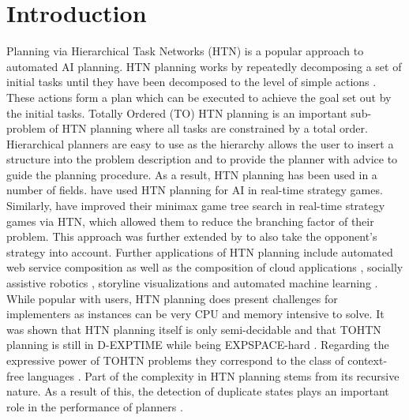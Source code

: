 \documentclass[enabledeprecatedfontcommands,12pt,a4paper,twoside]{scrartcl}
\numberwithin{equation}{section}
\begin{document}
\clearpage


\listoffigures
\listoftables
\listofalgorithms

\clearpage


\section{Introduction}
Planning via Hierarchical Task Networks (HTN) is a popular approach to automated AI planning. HTN planning works by repeatedly decomposing a set of initial tasks until they have been decomposed to the level of simple actions \cite{georgievski2015htn, bercher2019survey}. These actions form a plan which can be executed to achieve the goal set out by the initial tasks. Totally Ordered (TO) HTN planning is an important sub-problem of HTN planning where all tasks are constrained by a total order. \\
Hierarchical planners are easy to use as the hierarchy allows the user to insert a structure into the problem description and to provide the planner with advice to guide the planning procedure. As a result, HTN planning has been used in a number of fields. \cite{munoz2004role} have used HTN planning for AI in real-time strategy games. Similarly, \cite{ontanon2015adversarial} have improved their minimax game tree search in real-time strategy games via HTN, which allowed them to reduce the branching factor of their problem. This approach was further extended by \cite{lin2020htn} to also take the opponent's strategy into account. Further applications of HTN planning include automated web service composition \cite{sirin2004htn} as well as the composition of cloud applications \cite{georgievski2017cloud}, socially assistive robotics \cite{gonzalez2017three}, storyline visualizations \cite{padia2018yarn} and automated machine learning \cite{mohr2018ml}. \\
While popular with users, HTN planning does present challenges for implementers as instances can be very CPU and memory intensive to solve. It was shown that HTN planning itself is only semi-decidable and that TOHTN planning is still in D-EXPTIME while being EXPSPACE-hard \cite{erol1994htn, erol1996complexity}. Regarding the expressive power of TOHTN problems they correspond to the class of context-free languages \cite{holler2014language}. Part of the complexity in HTN planning stems from its recursive nature. As a result of this, the detection of duplicate states plays an important role in the performance of planners \cite{holler2021loop}. \\
\end{document}
